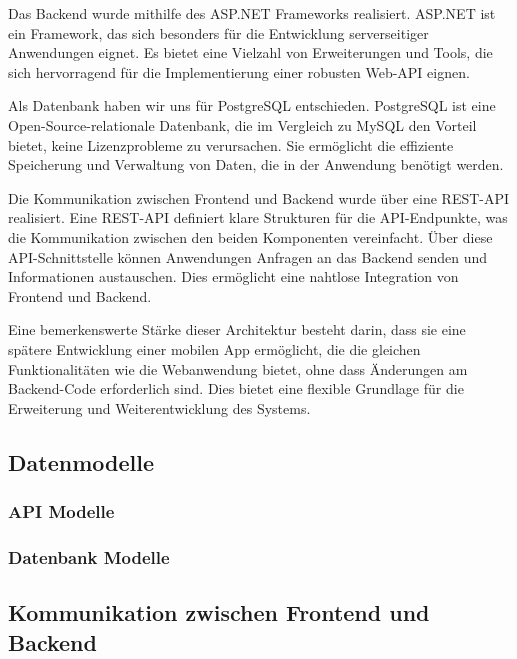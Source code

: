 \noindent Das Backend wurde mithilfe des ASP.NET Frameworks realisiert. 
ASP.NET ist ein Framework, das sich besonders für die Entwicklung serverseitiger Anwendungen eignet. 
Es bietet eine Vielzahl von Erweiterungen und Tools, die sich hervorragend für die Implementierung 
einer robusten Web-API eignen.\newline

\noindent Als Datenbank haben wir uns für PostgreSQL entschieden. 
PostgreSQL ist eine Open-Source-relationale Datenbank, die im Vergleich zu MySQL den Vorteil bietet, 
keine Lizenzprobleme zu verursachen. Sie ermöglicht die effiziente Speicherung und Verwaltung von 
Daten, die in der Anwendung benötigt werden.\newline

\noindent Die Kommunikation zwischen Frontend und Backend wurde über eine REST-API realisiert. 
Eine REST-API definiert klare Strukturen für die API-Endpunkte, was die Kommunikation zwischen 
den beiden Komponenten vereinfacht. Über diese API-Schnittstelle können Anwendungen Anfragen an 
das Backend senden und Informationen austauschen. Dies ermöglicht eine nahtlose Integration 
von Frontend und Backend.\newline

\noindent Eine bemerkenswerte Stärke dieser Architektur besteht darin, dass sie eine spätere 
Entwicklung einer mobilen App ermöglicht, die die gleichen Funktionalitäten wie die 
Webanwendung bietet, ohne dass Änderungen am Backend-Code erforderlich sind. 
Dies bietet eine flexible Grundlage für die Erweiterung und Weiterentwicklung des Systems.\newline

\subsection{Datenmodelle}



\subsubsection{API Modelle}

\subsubsection{Datenbank Modelle}

\subsection{Kommunikation zwischen Frontend und Backend}

